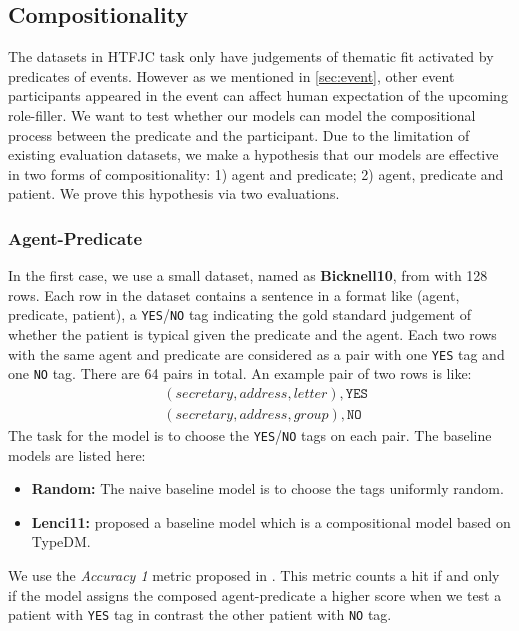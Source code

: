 \documentclass[a4paper]{article}
\begin{document}
\subsection{Compositionality}  \label{sec:compo}
The datasets in HTFJC task only have judgements of thematic fit activated by predicates of events. However as we mentioned in \ref{sec:event}, other event participants appeared in the event can affect human expectation of the upcoming role-filler. We want to test whether our models can model the compositional process between the predicate and the participant. Due to the limitation of existing evaluation datasets, we make a hypothesis that our models are effective in two forms of compositionality: 1) agent and predicate; 2) agent, predicate and patient. We prove this hypothesis via two evaluations. 


\subsubsection{Agent-Predicate} \label{sec:result-bicknell}
In the first case, we use a small dataset, named as \textbf{Bicknell10}, from \citet{bicknell2010effects} with 128 rows. Each row in the dataset contains a sentence in a format like (agent, predicate, patient), a \texttt{YES}/\texttt{NO} tag indicating the gold standard judgement of whether the patient is typical given the predicate and the agent. Each two rows with the same agent and predicate are considered as a pair with one \texttt{YES} tag and one \texttt{NO} tag. There are 64 pairs in total. An example pair of two rows is like: 
\begin{equation*} \label{eg:event-sim}
\begin{aligned}
    &(secretary, address, letter),  \texttt{YES} \\
    &(secretary, address, group), \texttt{NO}  
\end{aligned}
\end{equation*}
The task for the model is to choose the \texttt{YES}/\texttt{NO} tags on each pair. The baseline models are listed here:
\begin{itemize}
  \item \textbf{Random: } The naive baseline model is to choose the tags uniformly random. 
  \item \textbf{Lenci11: }  \citet{LenciECU} proposed a baseline model which is a compositional model based on TypeDM. 
\end{itemize}
We use the \textit{Accuracy 1} metric proposed in \citet{tilk2016event}. This metric counts a hit if and only if the model assigns the composed agent-predicate a higher score when we test a patient with \texttt{YES} tag in contrast the other patient with \texttt{NO} tag. 
\end{document}
